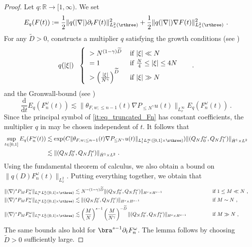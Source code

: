 \documentclass[11pt]{article}
\begin{document}
\begin{proof} Let \( q\colon \mathbb{R} \rightarrow [1,\infty) \). We set 
\begin{equation*}
E_q(F(t)) := \frac{1}{2} \| q(|\nabla| ) \partial_t F(t) \|_{L_x^2(\rthree)}^2 + \frac{1}{2} \| q(|\nabla|) \nabla F(t) \|_{L_x^2(\rthree)}^2~. 
\end{equation*}
For any \( \widetilde{D}> 0 \),  \cite{TG05} constructs a multiplier \( q \) satisfying the growth conditions (see \cite[(16)]{TG05}) 
\begin{equation*}
q(|\xi|)  ~~ \begin{cases}
\begin{tabular}{ll}
\( > N^{(1-\gamma)\widetilde{D}} \) & if \( |\xi|\ll N \)\\
\( = 1 \) & if \( \frac{N}{4} \leq |\xi|\leq 4N \)\\
\( > \left( \frac{|\xi|}{N^\gamma} \right)^{\widetilde{D}}\) & if \( |\xi| \gg N \)
\end{tabular}
\end{cases}~. 
\end{equation*}
and the Gronwall-bound (see \cite[(15)]{TG05})
\begin{equation*}
\frac{\mathrm{d}}{\mathrm{d}t} E_q( F_n^\omega(t)) \lesssim \| \theta_{F,w;\leq n-1}(t) \nabla P_{\leq N^\gamma} u(t) \|_{L_x^\infty} E_q(F_n^\omega(t))~. 
\end{equation*}
Since the principal symbol of \eqref{it:eq_truncated_Fn} has constant coefficients, the multiplier \( q \) in \cite{TG05} may be chosen independent of \( t \). It follows that 
\begin{align*}
\sup_{t\in [0,1]} E_q(F_n^\omega(t)) &\lesssim \exp(  C \| \theta_{F,w;\leq n-1}(t) \nabla P_{\leq N^\gamma} u(t) \|_{L_t^1 L_x^\infty([0,1]\times \rthree)}) \| (Q_N f_0^\omega, Q_N f_1^\omega) \|_{\dot{H}^1\times L^2} \\
&\lesssim  \| (Q_N f_0^\omega, Q_N f_1^\omega) \|_{\dot{H}^1\times L^2} ~. 
\end{align*}
Using the fundamental theorem of calculus, we also obtain a bound on  \( \|  q(D) F_n^\omega(t) \|_{L_x^2} \). Putting everything together, we obtain that 
\begin{alignat*}{3}
\| \langle \nabla \rangle^s P_M F_n^\omega \|_{L_t^\infty L_x^2([0,1]\times \rthree)} &\lesssim N^{-(1-\gamma) \widetilde{D} } \| (Q_N f_0^\omega, Q_N f_1^\omega)\|_{H^s\times H^{s-1}} \qquad \qquad &&\text{if}  ~ 1\leq M\ll N~, \\
\| \langle \nabla \rangle^s P_M F_n^\omega \|_{L_t^\infty L_x^2([0,1]\times \rthree)} &\lesssim \| (Q_N f_0^\omega, Q_N f_1^\omega)\|_{H^s\times H^{s-1}} \qquad \qquad &&\text{if}  ~ M \sim N~, \\
\| \langle \nabla \rangle^s P_M F_n^\omega \|_{L_t^\infty L_x^2([0,1]\times \rthree)} &\lesssim \left( \frac{M}{N} \right)^{s-1} \left( \frac{M}{N^\gamma} \right)^{-\widetilde{D}} \| (Q_N f_0^\omega, Q_N f_1^\omega)\|_{H^s\times H^{s-1}} \qquad \qquad &&\text{if}  ~ M \gg  N~, 
\end{alignat*}
The same bounds also hold for \( \bra^{s-1} \partial_t F_n^\omega \). The lemma follows by choosing \( \widetilde{D}>0 \) sufficiently large. 
\end{proof}
\end{document}
